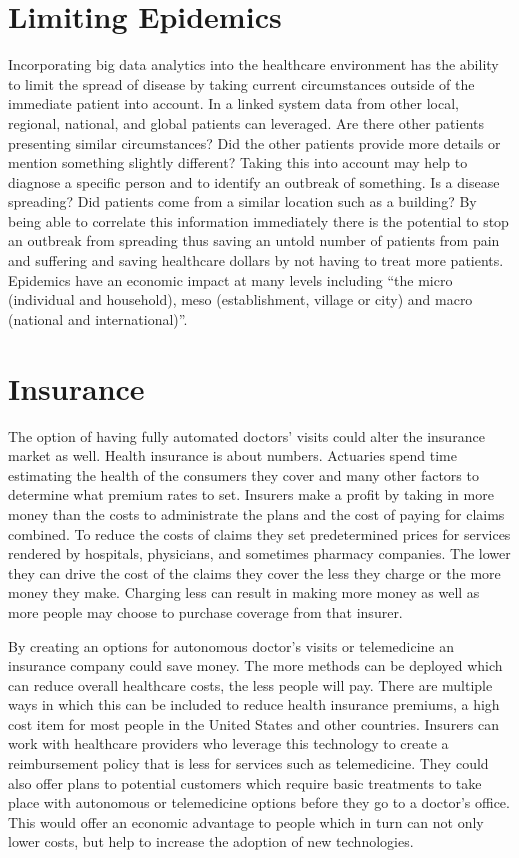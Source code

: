 \documentclass[sigconf]{acmart}
\begin{document}
\section{Limiting Epidemics}
Incorporating big data analytics into the healthcare environment has the 
ability to limit the spread of disease by taking current circumstances 
outside of the immediate patient into account.  In a linked system data 
from other local, regional, national, and global patients can leveraged.  
Are there other patients presenting similar circumstances?  Did the other 
patients provide more details or mention something slightly different?  
Taking this into account may help to diagnose a specific person and to 
identify an outbreak of something.  Is a disease spreading?  Did patients 
come from a similar location such as a building?  By being able to 
correlate this information immediately there is the potential to stop an 
outbreak from spreading thus saving an untold number of patients from 
pain and suffering and saving healthcare dollars by not having to treat 
more patients.  Epidemics have an economic impact at many levels 
including ``the micro (individual and household), meso (establishment, 
village or city) and macro (national and 
international)''\cite{WHOResponse}.

\section{Insurance}
The option of having fully automated doctors' visits could alter the 
insurance market as well.  Health insurance is about numbers.  Actuaries 
spend time estimating the health of the consumers they cover and many 
other factors to determine what premium rates to set\cite{Actuary}.  
Insurers make a profit by taking in more money than the costs to 
administrate the plans and the cost of paying for claims combined.  
To reduce the costs of claims they set predetermined prices for services 
rendered by hospitals, physicians, and sometimes pharmacy companies.  
The lower they can drive the cost of the claims they cover the less 
they charge or the more money they make.  Charging less can result in 
making more money as well as more people may choose to purchase 
coverage from that insurer.

By creating an options for autonomous doctor's visits or telemedicine 
an insurance company could save money.  The more methods can be deployed 
which can reduce overall healthcare costs, the less people will pay.  
There are multiple ways in which this can be included to reduce health 
insurance premiums, a high cost item for most people in the United States 
and other countries.  Insurers can work with healthcare providers who 
leverage this technology to create a reimbursement policy that is less 
for services such as telemedicine\cite{MedicalEconomics}.  They could 
also offer plans to potential customers which require basic treatments 
to take place with autonomous or telemedicine options before they go 
to a doctor's office.  This would offer an economic advantage to people 
which in turn can not only lower costs, but help to increase the 
adoption of new technologies.
\end{document}
